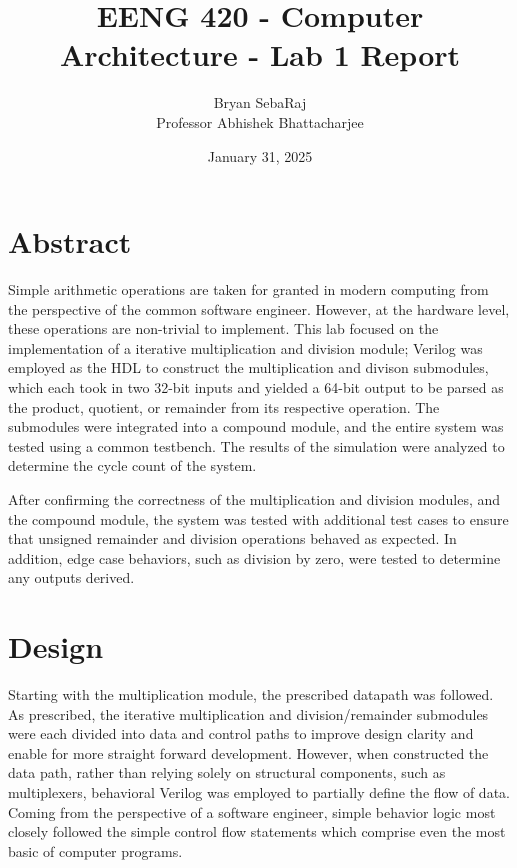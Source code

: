 \documentclass[12pt]{article}
\title{EENG 420 - Computer Architecture - Lab 1 Report}
\author{Bryan SebaRaj \\[0.5em] Professor Abhishek Bhattacharjee}
\date{January 31, 2025}
\begin{document}
\maketitle

%
%

\section*{Abstract}

Simple arithmetic operations are taken for granted in modern computing from the
perspective of the common software engineer. However, at the hardware level,
these operations are non-trivial to implement. This lab focused on the
implementation of a iterative multiplication and division module; Verilog was
employed as the HDL to construct the multiplication and divison submodules,
which each took in two 32-bit inputs and yielded a 64-bit output to be parsed
as the product, quotient, or remainder from its respective operation. The submodules were integrated into a
compound module, and the entire system was tested using a common testbench. The
results of the simulation were analyzed to determine the cycle count of the
system.

After confirming the correctness of the multiplication and division modules, and 
the compound module, the system was tested with additional test cases to ensure that unsigned remainder and division operations behaved as 
expected. In addition, edge case behaviors, such as division by zero, were tested to determine any outputs derived. 


\section*{Design}

Starting with the multiplication module, the prescribed datapath was followed.
As prescribed, the iterative multiplication and division/remainder submodules
were each divided into data and control paths to improve design clarity and
enable for more straight forward development. However, when constructed the
data path, rather than relying solely on structural components, such as
multiplexers, behavioral Verilog was employed to partially define the flow of
data. Coming from the perspective of a software engineer, simple behavior logic
most closely followed the simple control flow statements which comprise even
the most basic of computer programs. 
\end{document}

